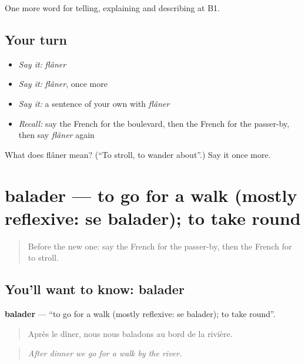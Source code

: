 \begin{grammarlens}[title={What you've built}]
One more word for telling, explaining and describing at B1.
\end{grammarlens}

\subsection*{Your turn}
\begin{itemize}
\raggedright
  \item \emph{Say it:} \emph{flâner}
  \item \emph{Say it:} \emph{flâner}, once more
  \item \emph{Say it:} a sentence of your own with \emph{flâner}
  \item \emph{Recall:} say the French for the boulevard, then the French for the passer-by, then say \emph{flâner} again
\end{itemize}

\begin{tcolorbox}[breakable,colback=teal!4,colframe=teal!35!black,title={Before you move on}]
What does flâner mean? (\textquotedblleft{}To stroll, to wander about\textquotedblright{}.) Say it once more.
\end{tcolorbox}
\section[balader]{balader — to go for a walk (mostly reflexive: se balader); to take round}

\label{lesson:FR-C438-balader}



\begin{quote}
Before the new one: say the French for the passer-by, then the French for to stroll.
\end{quote}

\subsection*{You'll want to know: balader}
\textbf{balader} — \textquotedblleft{}to go for a walk (mostly reflexive: se balader); to take round\textquotedblright{}.

\begin{quote}
Après le dîner, nous nous baladons au bord de la rivière.
\end{quote}

\begin{quote}
\emph{After dinner we go for a walk by the river.}
\end{quote}

